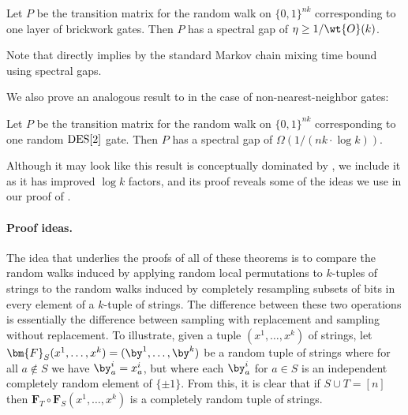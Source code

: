 \begin{theorem} \label{thm:one-layer-brickwork}
    Let $P$ be the transition matrix for the random walk on $\{0,1\}^{nk}$ corresponding to one layer of brickwork gates. Then $P$ has a spectral gap of $\eta \geq 1/\wt{O}(k)$.
\end{theorem}
Note that  directly implies  by the standard Markov chain mixing time bound using spectral gaps.

We also prove an analogous result to  in the case of non-nearest-neighbor gates:
\begin{theorem} \label{thm:one-random-nonlocal}
    Let $P$ be the transition matrix for the random walk on $\{0,1\}^{nk}$ corresponding to one random $\mathrm{DES}[2]$ gate. Then $P$ has a spectral gap of $\Omega(1/(n k\cdot \log k))$.
\end{theorem}
Although it may look like this result is conceptually dominated by , we include it as it has improved $\log k$ factors, and its proof reveals some of the ideas we use in our proof of .

\paragraph{Proof ideas.} The idea that underlies the proofs of all of these theorems is to compare the random walks induced by applying random local permutations to $k$-tuples of strings to the random walks induced by completely resampling subsets of bits in every element of a $k$-tuple of strings. The difference between these two operations is essentially the difference between sampling with replacement and sampling without replacement. To illustrate, given a tuple $(x^1,\dots,x^k)$ of strings, let $\bm{F}_S(x^1,\dots,x^k)=(\by^1,\dots,\by^k)$ be a random tuple of strings where for all $a\not\in S$ we have $\by^i_a = x^i_a$, but where each $\by^i_a$ for $a\in S$ is an independent completely random element of $\{\pm1\}$. From this, it is clear that if $S\cup T=[n]$ then $\bm{F}_T\circ\bm{F}_S(x^1,\dots,x^k)$ is a completely random tuple of strings. 

